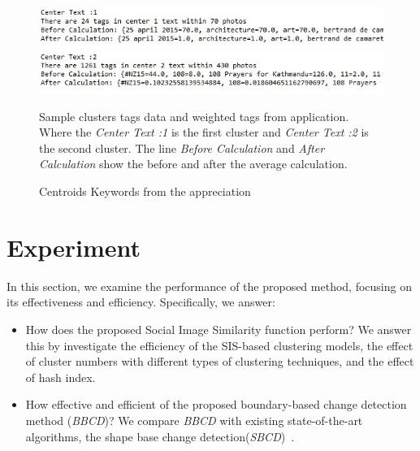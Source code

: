 \documentclass[runningheads,a4paper]{llncs}
\begin{document}
{\begin{figure}[h]
	\centering
	\includegraphics[width=50cm,bb=0 0 1820 73]{centroid.jpg}
	\includegraphics[width=50cm,bb=0 0 1820 73]{centroid2.jpg}
	\caption{Centroids Keywords from the appreciation}
	{\footnotesize Sample clusters tags data and weighted tags from application. Where the \textit{Center Text :1} is the first cluster and \textit{Center Text :2} is the second cluster. The line \textit{Before Calculation} and \textit{After Calculation} show the before and after the average calculation.}
\end{figure}

\pagebreak
}
\section{Experiment} \label{sec-evaluation}

In this section, 
we examine the performance of the proposed method,
focusing on its effectiveness and efficiency. 
Specifically, 
we answer:
\begin{itemize}
\item How does the proposed Social Image Similarity function perform? 
We answer this by investigate the efficiency of the SIS-based clustering models,
the effect of cluster numbers with different types of clustering techniques,
and the effect of hash index. 
\item How effective and efficient of the proposed boundary-based change detection method (\emph{BBCD})?
We compare \emph{BBCD} with existing state-of-the-art algorithms, the shape base change detection(\textit{SBCD})~\cite{rs2051217}. 
\end{itemize}

%
\end{document}
